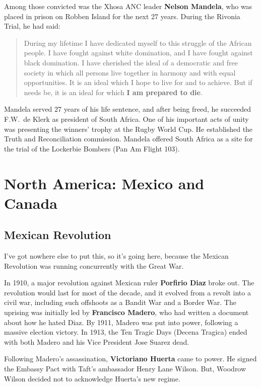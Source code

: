 Among those convicted was the Xhosa ANC leader \textbf{Nelson Mandela},
who was placed in prison on Robben Island for the next 27 years.
During the Rivonia Trial, he had said:
\begin{quote}
  During my lifetime I have dedicated myself to this struggle of the African people.
  I have fought against white domination, and I have fought against black domination.
  I have cherished the ideal of a democratic and free society in which all persons live together
  in harmony and with equal opportunities.
  It is an ideal which I hope to live for and to achieve.
  But if needs be, it is an ideal for which \textbf{I am prepared to die}.
\end{quote}
Mandela served 27 years of his life sentence, and after being freed,
he succeeded F.W.\ de Klerk as president of South Africa.
One of his important acts of unity was presenting the winners' trophy at the Rugby World Cup.
He established the Truth and Reconciliation commission.
Mandela offered South Africa as a site for the trial of the Lockerbie Bombers (Pan Am Flight 103).

\section{North America: Mexico and Canada}

\subsection*{Mexican Revolution}

I've got nowhere else to put this, so it's going here,
because the Mexican Revolution was running concurrently with the Great War.

In 1910, a major revolution against Mexican ruler \textbf{Porfirio Diaz} broke out.
The revolution would last for most of the decade, and it evolved from a revolt into a civil war,
including such offshoots as a Bandit War and a Border War.
The uprising was initially led by \textbf{Francisco Madero},
who had written a document about how he hated Diaz.
By 1911, Madero was put into power, following a massive election victory.
In 1913, the Ten Tragic Days (Decena Tragica) ended with both Madero and his Vice President Jose Suarez dead.

Following Madero's assassination, \textbf{Victoriano Huerta} came to power.
He signed the Embassy Pact with Taft's ambassador Henry Lane Wilson.
But, Woodrow Wilson decided not to acknowledge Huerta's new regime.

